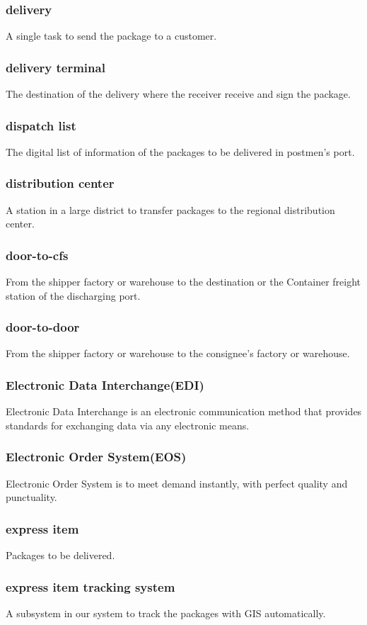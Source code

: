 \documentclass[12pt]{scrreprt}
\begin{document}
\begin{spacing}{0.7}
\subsubsection{delivery}
A single task to send the package to a customer.
\subsubsection{delivery terminal}
The destination of the delivery where the receiver receive and sign the package.
\subsubsection{dispatch list}
The digital list of information of the packages to be delivered in
postmen’s port.
\subsubsection{distribution center}
A station in a large district to transfer packages to the regional
distribution center.
\subsubsection{door-to-cfs}
From the shipper factory or warehouse to the destination or the
Container freight station of the discharging port.
\subsubsection{door-to-door}
From the shipper factory or warehouse to the consignee's factory
or warehouse.
\subsubsection{Electronic Data Interchange(EDI)}
Electronic Data Interchange is an electronic communication method that provides
standards for exchanging data via any electronic means.
\subsubsection{Electronic Order System(EOS)}
Electronic Order System is to meet demand instantly,
with perfect quality and punctuality.
\subsubsection{express item}
Packages to be delivered.
\subsubsection{express item tracking system}
A subsystem in our system to track the packages with GIS automatically.

\end{spacing}
\end{document}
